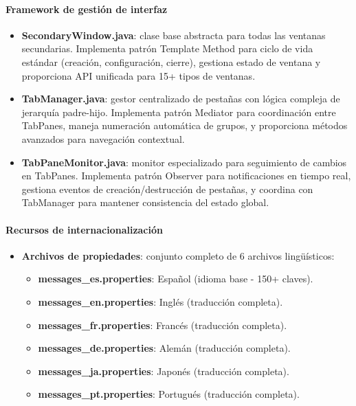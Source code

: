 \paragraph{Framework de gestión de interfaz}
\begin{itemize}
    \item \textbf{SecondaryWindow.java}: clase base abstracta para todas las ventanas secundarias. Implementa patrón Template Method para ciclo de vida estándar (creación, configuración, cierre), gestiona estado de ventana y proporciona API unificada para 15+ tipos de ventanas.

    \item \textbf{TabManager.java}: gestor centralizado de pestañas con lógica compleja de jerarquía padre-hijo. Implementa patrón Mediator para coordinación entre TabPanes, maneja numeración automática de grupos, y proporciona métodos avanzados para navegación contextual.

    \item \textbf{TabPaneMonitor.java}: monitor especializado para seguimiento de cambios en TabPanes. Implementa patrón Observer para notificaciones en tiempo real, gestiona eventos de creación/destrucción de pestañas, y coordina con TabManager para mantener consistencia del estado global.
\end{itemize}

\paragraph{Recursos de internacionalización}
\begin{itemize}
    \item \textbf{Archivos de propiedades}: conjunto completo de 6 archivos lingüísticos:
    \begin{itemize}
        \item \textbf{messages\_es.properties}: Español (idioma base - 150+ claves).
        \item \textbf{messages\_en.properties}: Inglés (traducción completa).
        \item \textbf{messages\_fr.properties}: Francés (traducción completa).
        \item \textbf{messages\_de.properties}: Alemán (traducción completa).
        \item \textbf{messages\_ja.properties}: Japonés (traducción completa).
        \item \textbf{messages\_pt.properties}: Portugués (traducción completa).
    \end{itemize}
\end{itemize}

